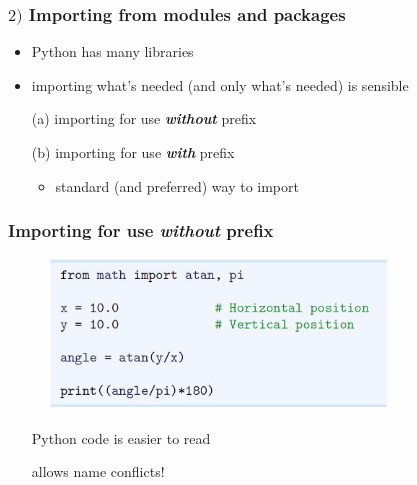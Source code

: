 \documentclass[14pt]{beamer}
\newcommand\red[1]{{\color{red} #1}}
\newcommand\green[1]{{\color{green} #1}}
\newcommand{\cmark}{\ding{51}}%
\newcommand{\xmark}{\ding{55}}%
\begin{document}
\begin{frame}[fragile]

\frametitle{$2)$ Importing from modules and packages}

\begin{itemize}
	\item Python has many libraries
	\item importing what's needed (and only what's needed) is sensible
\end{itemize}

\begin{itemize}
	\item[(a)] importing for use \textbf{\emph{without}} prefix %

	\item[]

	\item[(b)] importing for use \textbf{\emph{with}} prefix %
	
	\begin{itemize}
		\item standard (and preferred) way to import
	\end{itemize}

\end{itemize}

\end{frame}


\begin{frame}[fragile]
\frametitle{Importing for use \emph{without} prefix}

\begin{figure}[ht]
	\centering
	\includegraphics[width=0.8\textwidth]{figures/LLp13b}
\end{figure}
\begin{itemize}
	\item[\green{\cmark}] Python code is easier to read
	\item[\red{\xmark}] allows name conflicts!
\end{itemize}

\end{frame}
\end{document}
